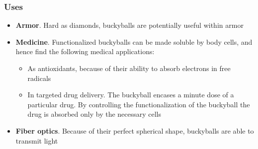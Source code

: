 \documentclass{beamer}
\begin{document}
\begin{frame}
	\frametitle{Uses}
	\begin{itemize}
		\item \textbf{Armor}. Hard as diamonds, buckyballs are potentially useful within armor
		
		\item \textbf{Medicine}. Functionalized buckyballs can be made soluble by body cells, and hence find the following medical applications:
			\begin{itemize}
				\item As antioxidants, because of their ability to absorb electrons in free radicals
				
				\item In targeted drug delivery. The buckyball encases a minute dose of a particular drug. By controlling the functionalization of the buckyball the drug is absorbed only by the necessary cells
			\end{itemize}
		\item \textbf{Fiber optics}. Because of their perfect spherical shape, buckyballs are able to transmit light
	\end{itemize}
\end{frame}
\end{document}

